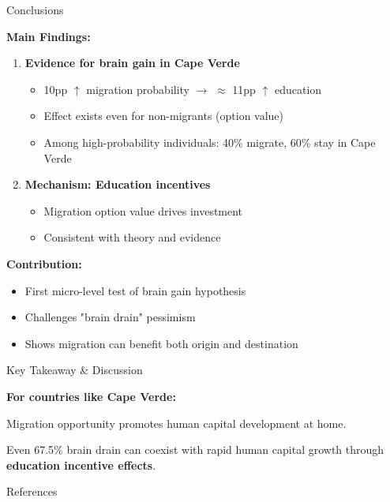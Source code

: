 \documentclass{beamer}
\begin{document}
\begin{frame}{Conclusions}

\textbf{Main Findings:}
\begin{enumerate}
    \item \textbf{Evidence for brain gain in Cape Verde}
    \begin{itemize}
        \item 10pp $\uparrow$ migration probability $\rightarrow$ $\approx$ 11pp $\uparrow$ education
        \item Effect exists even for non-migrants (option value)
     \item Among high-probability individuals: 40\% migrate, 60\% stay in Cape Verde
    \end{itemize}
    \item \textbf{Mechanism: Education incentives}
    \begin{itemize}
        \item Migration option value drives investment
        \item Consistent with theory and evidence
    \end{itemize}
\end{enumerate}

\vspace{0.3cm}
\textbf{Contribution:}
\begin{itemize}
    \item First micro-level test of brain gain hypothesis
    \item Challenges "brain drain" pessimism
    \item Shows migration can benefit both origin and destination
\end{itemize}
\end{frame}

\begin{frame}{Key Takeaway \& Discussion}

\begin{tcolorbox}[colback=blue!5!white, colframe=blue!75!black, width=0.95\textwidth]
\textbf{For countries like Cape Verde:}

Migration opportunity promotes human capital development at home.

Even 67.5\% brain drain can coexist with rapid human capital growth through \textbf{education incentive effects}.
\end{tcolorbox}


\end{frame}


\begin{frame}[allowframebreaks]{References}
    \printbibliography
\end{frame}
\end{document}
